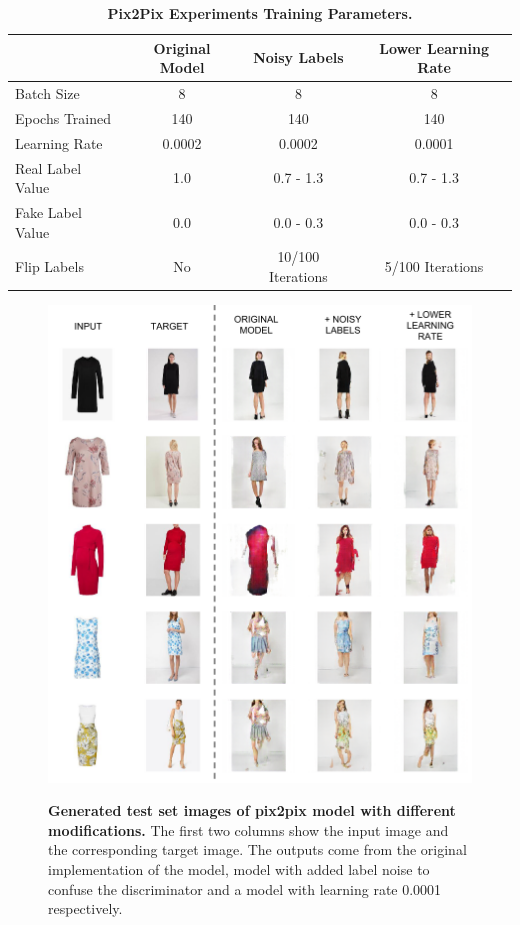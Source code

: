 \documentclass[12pt]{report}
\begin{document}
\begin{table}[h]
\centering
\begin{tabular}{@{}lccc@{}}
\toprule
                 & Original Model & Noisy Labels      & Lower Learning Rate \\ \midrule
Batch Size       & 8              & 8                 & 8                   \\
Epochs Trained   & 140            & 140               & 140                 \\
Learning Rate    & 0.0002         & 0.0002            & 0.0001              \\
Real Label Value & 1.0            & 0.7 - 1.3         & 0.7 - 1.3           \\
Fake Label Value & 0.0            & 0.0 - 0.3         & 0.0 - 0.3           \\
Flip Labels    & No             & 10/100 Iterations & 5/100 Iterations    \\ \bottomrule
\end{tabular}
\caption{\label{tab:pix2pix_exp} \textbf{Pix2Pix Experiments Training Parameters.}}
\end{table}


\begin{figure}[!h]
\centering
{\includegraphics[width=.8\linewidth]{04_experiments/pix2pix/results}}
\caption{\label{fig:pix2pix_results} \textbf{Generated test set images of pix2pix model with different modifications.} The first two columns show the input image and the corresponding target image. The outputs come from the original implementation of the model, model with added label noise to confuse the discriminator and a model with learning rate 0.0001 respectively.}
\end{figure}
\end{document}
